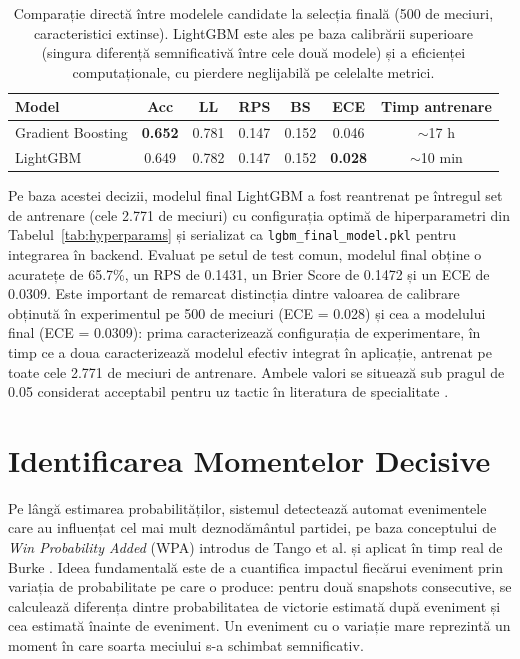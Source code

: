 \begin{table}[htbp]
\centering
\begin{tabular}{|l|ccccc|c|}
\hline
\textbf{Model} & \textbf{Acc} & \textbf{LL} & \textbf{RPS}
& \textbf{BS} & \textbf{ECE} & \textbf{Timp antrenare} \\
\hline
Gradient Boosting & \textbf{0.652} & 0.781 & 0.147 & 0.152 & 0.046
& $\sim$17 h \\
LightGBM          & 0.649 & 0.782 & 0.147 & 0.152 & \textbf{0.028}
& $\sim$10 min \\
\hline
\end{tabular}
\caption{Comparație directă între modelele candidate la selecția finală
         (500 de meciuri, caracteristici extinse). LightGBM este ales pe
         baza calibrării superioare (singura diferență semnificativă între
         cele două modele) și a eficienței computaționale, cu pierdere
         neglijabilă pe celelalte metrici.}
\label{tab:selectie_finala}
\end{table}

Pe baza acestei decizii, modelul final LightGBM a fost reantrenat pe
întregul set de antrenare (cele 2.771 de meciuri) cu configurația optimă
de hiperparametri din Tabelul~\ref{tab:hyperparams} și serializat ca
\texttt{lgbm\_final\_model.pkl} pentru integrarea în backend. Evaluat pe
setul de test comun, modelul final obține o acuratețe de 65.7\%, un RPS de
0.1431, un Brier Score de 0.1472 și un ECE de 0.0309. Este important de
remarcat distincția dintre valoarea de calibrare obținută în experimentul
pe 500 de meciuri (ECE = 0.028) și cea a modelului final (ECE = 0.0309):
prima caracterizează configurația de experimentare, în timp ce a doua
caracterizează modelul efectiv integrat în aplicație, antrenat pe toate
cele 2.771 de meciuri de antrenare. Ambele valori se situează sub pragul
de 0.05 considerat acceptabil pentru uz tactic în literatura de
specialitate \cite{Robberechts2019}.

\section{Identificarea Momentelor Decisive}

Pe lângă estimarea probabilităților, sistemul detectează automat
evenimentele care au influențat cel mai mult deznodământul partidei, pe
baza conceptului de \textit{Win Probability Added} (WPA) introdus de Tango
et al. \cite{Tango2007} și aplicat în timp real de Burke \cite{Burke2010}.
Ideea fundamentală este de a cuantifica impactul fiecărui eveniment prin
variația de probabilitate pe care o produce: pentru două snapshots
consecutive, se calculează diferența dintre probabilitatea de victorie
estimată după eveniment și cea estimată înainte de eveniment. Un eveniment
cu o variație mare reprezintă un moment în care soarta meciului s-a
schimbat semnificativ.

